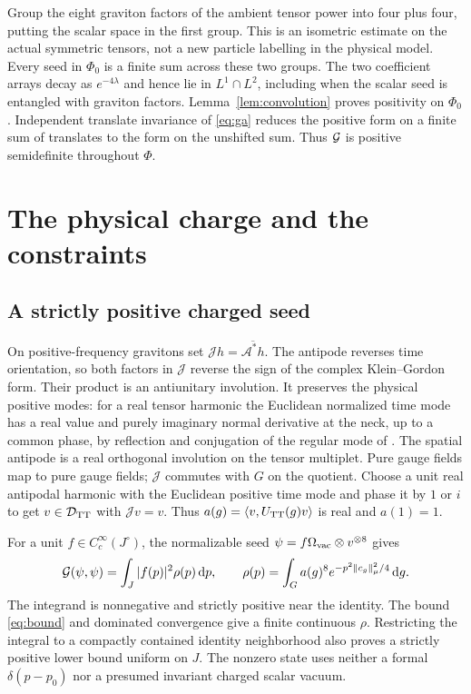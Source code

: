 \documentclass[11pt]{article}
\newcommand{\DD}{\mathcal D}
\newcommand{\dd}{\,\mathrm d}
\newcommand{\vac}{\Omega_{\rm vac}}
\numberwithin{equation}{section}
\begin{document}
Group the eight graviton factors of the ambient tensor power
into four plus four, putting the scalar space in the first group.
This is an isometric estimate on the actual symmetric tensors,
not a new particle labelling in the physical model.
Every seed in \(\Phi_0\) is a finite sum across these two groups.
The two coefficient arrays decay as \(e^{-4\lambda}\) and hence
lie in \(L^1\cap L^2\), including when the scalar seed is entangled
with graviton factors. Lemma~\ref{lem:convolution} proves positivity
on \(\Phi_0\). Independent translate invariance of \eqref{eq:ga}
reduces the positive form on a finite sum of translates to the
form on the unshifted sum. Thus \(\cal G\) is positive
semidefinite throughout \(\Phi\).

\section{The physical charge and the constraints}

\subsection{A strictly positive charged seed}

On positive-frequency gravitons set
\(\mathcal J h=\overline{\mathcal A^*h}\).
The antipode reverses time orientation, so both factors in
\(\mathcal J\) reverse the sign of the complex Klein--Gordon
form. Their product is an antiunitary involution.
It preserves the physical positive modes: for a real tensor
harmonic the Euclidean normalized time mode has a real value
and purely imaginary normal derivative at the neck, up to a
common phase, by reflection and conjugation of the regular
mode of \cite[Eq.~(121)]{mmfree}. The spatial antipode is a
real orthogonal involution on the tensor multiplet.
Pure gauge fields map to pure gauge fields; \(\mathcal J\)
commutes with \(G\) on the quotient. Choose a unit real
antipodal harmonic with the Euclidean positive time mode and
phase it by \(1\) or \(i\) to get \(v\in\DD_{\rm TT}\) with
\(\mathcal Jv=v\).
Thus \(a(g)=\langle v,U_{\rm TT}(g)v\rangle\) is real and
\(a(1)=1\).

For a unit \(f\in C_c^\infty(J^\circ)\), the normalizable seed
\(\psi=f\vac\otimes v^{\otimes8}\) gives
\begin{equation}
 {\cal G}(\psi,\psi)=\int_J |f(p)|^2\rho(p)\dd p,\qquad
 \rho(p)=\int_G a(g)^8
                    e^{-p^2\|c_g\|_\mu^2/4}\dd g .
 \label{eq:density}
\end{equation}
The integrand is nonnegative and strictly positive near the identity.
The bound \eqref{eq:bound} and dominated convergence give a
finite continuous \(\rho\). Restricting the integral to a compactly
contained identity neighborhood also proves a strictly positive
lower bound uniform on \(J\).
The nonzero state uses neither a formal \(\delta(p-p_0)\) nor a
presumed invariant charged scalar vacuum.
\end{document}
